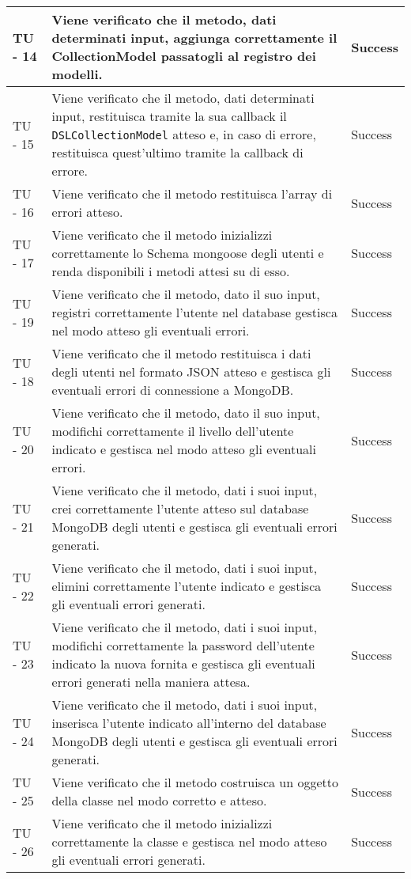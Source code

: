 \begin{center}
\begin{longtable}{ | p{3cm} | p{9cm} | p{2cm} | }
TU - 14 & Viene verificato che il metodo, dati determinati input, aggiunga correttamente il CollectionModel passatogli al registro dei modelli. & Success \\ \hline
TU - 15 & Viene verificato che il metodo, dati determinati input, restituisca tramite la sua callback il \texttt{DSLCollectionModel} atteso e, in caso di errore, restituisca quest'ultimo tramite la callback di errore. & Success \\ \hline
TU - 16 & Viene verificato che il metodo restituisca l'array di errori atteso. & Success \\ \hline
TU - 17 & Viene verificato che il metodo inizializzi correttamente lo Schema mongoose degli utenti e renda disponibili i metodi attesi su di esso. & Success \\ \hline
TU - 19 & Viene verificato che il metodo, dato il suo input, registri correttamente l'utente nel database gestisca nel modo atteso gli eventuali errori. & Success \\ \hline
TU - 18 & Viene verificato che il metodo restituisca i dati degli utenti nel formato JSON atteso e gestisca gli eventuali errori di connessione a MongoDB. & Success \\ \hline
TU - 20 & Viene verificato che il metodo, dato il suo input, modifichi correttamente il livello dell'utente indicato e gestisca nel modo atteso gli eventuali errori. & Success \\ \hline
TU - 21 & Viene verificato che il metodo, dati i suoi input, crei correttamente l'utente atteso sul database MongoDB degli utenti e gestisca gli eventuali errori generati. & Success \\ \hline
TU - 22 & Viene verificato che il metodo, dati i suoi input, elimini correttamente l'utente indicato e gestisca gli eventuali errori generati. & Success \\ \hline
TU - 23 & Viene verificato che il metodo, dati i suoi input, modifichi correttamente la password dell'utente indicato la nuova fornita e gestisca gli eventuali errori generati nella maniera attesa. & Success \\ \hline
TU - 24 & Viene verificato che il metodo, dati i suoi input, inserisca l'utente indicato all'interno del database MongoDB degli utenti e gestisca gli eventuali errori generati. & Success \\ \hline
TU - 25 & Viene verificato che il metodo costruisca un oggetto della classe nel modo corretto e atteso. & Success \\ \hline
TU - 26 & Viene verificato che il metodo inizializzi correttamente la classe e gestisca nel modo atteso gli eventuali errori generati. & Success \\ \hline

\end{longtable}
\end{center}
